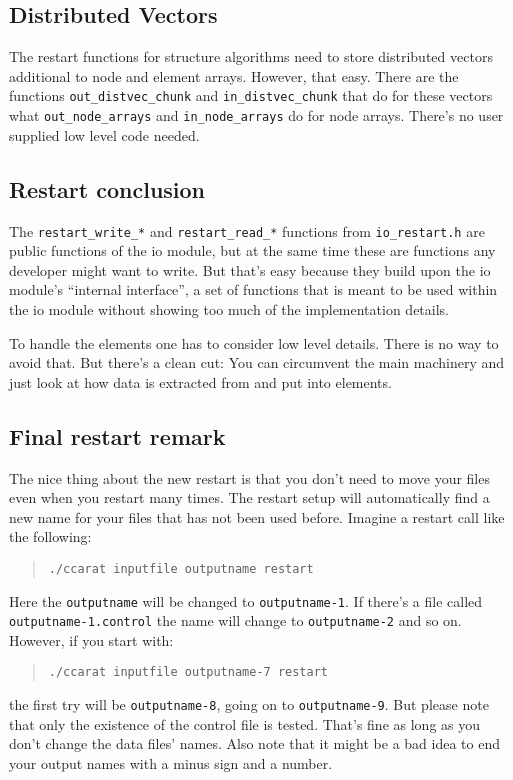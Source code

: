 \subsection{Distributed Vectors}

The restart functions for structure algorithms need to store distributed
vectors additional to node and element arrays. However, that easy.
There are the functions \texttt{out{\_}distvec{\_}chunk} and \texttt{in{\_}distvec{\_}chunk}
that do for these vectors what \texttt{out{\_}node{\_}arrays}
and \texttt{in{\_}node{\_}arrays} do for node arrays. There's
no user supplied low level code needed.


\subsection{Restart conclusion}

The \texttt{restart{\_}write{\_}{*}} and \texttt{restart{\_}read{\_}{*}}
functions from \texttt{io{\_}restart.h} are public functions of
the io module, but at the same time these are functions any developer
might want to write. But that's easy because they build upon the io
module's {}``internal interface'', a set of functions that is meant
to be used within the io module without showing too much of the implementation
details.

To handle the elements one has to consider low level details. There
is no way to avoid that. But there's a clean cut: You can circumvent
the main machinery and just look at how data is extracted from and
put into elements.


\subsection{Final restart remark}

The nice thing about the new restart is that you don't need to move
your files even when you restart many times. The restart setup will
automatically find a new name for your files that has not been used
before. Imagine a restart call like the following: 

\begin{quote}
\texttt{./ccarat~inputfile~outputname~restart }
\end{quote}
Here the \texttt{outputname} will be changed to \texttt{outputname-1}.
If there's a file called \texttt{outputname-1.control} the name will
change to \texttt{outputname-2} and so on. However, if you start with: 

\begin{quote}
\texttt{./ccarat~inputfile~outputname-7~restart }
\end{quote}
the first try will be \texttt{outputname-8}, going on to \texttt{outputname-9}.
But please note that only the existence of the control file is tested.
That's fine as long as you don't change the data files' names. Also
note that it might be a bad idea to end your output names with a minus
sign and a number.


